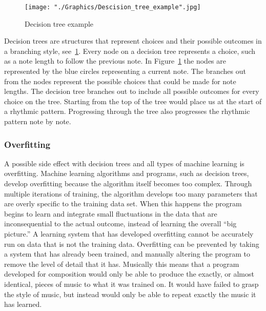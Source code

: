 \documentclass{sig-alternate}
\begin{document}
\begin{figure}
	\texttt{[image: "./Graphics/Descision\_tree\_example".jpg]}
	\caption{Decision tree example}
	\label{fig:decisiontree}
\end{figure}

Decision trees are structures that represent choices and their possible outcomes in a branching style, see~\ref{fig:decisiontree}. Every node on a decision tree represents a choice, such as a note length to follow the previous note. In Figure~\ref{fig:decisiontree} the nodes are represented by the blue circles representing a current note. The branches out from the nodes represent the possible choices that could be made for note lengths. The decision tree branches out to include all possible outcomes for every choice on the tree.  Starting from the top of the tree would place us at the start of a rhythmic pattern. Progressing through the tree also progresses the rhythmic pattern note by note. 



\subsubsection{Overfitting}
\label{sec:overfitting}
A possible side effect with decision trees and all types of machine learning is overfitting. Machine learning algorithms and programs, such as decision trees, develop overfitting because the algorithm itself becomes too complex. Through multiple iterations of training, the algorithm develops too many parameters that are overly specific to the training data set. When this happens the program begins to learn and integrate small fluctuations in the data that are inconsequential to the actual outcome, instead of learning the overall ``big picture.'' A learning system that has developed overfitting cannot be accurately run on data that is not the training data. Overfitting can be prevented by taking a system that has already been trained, and manually altering the program to remove the level of detail that it has. Musically this means that a program developed for composition would only be able to produce the exactly, or almost identical, pieces of music to what it was trained on. It would have failed to grasp the style of music, but instead would only be able to repeat exactly the music it has learned.
\end{document}
